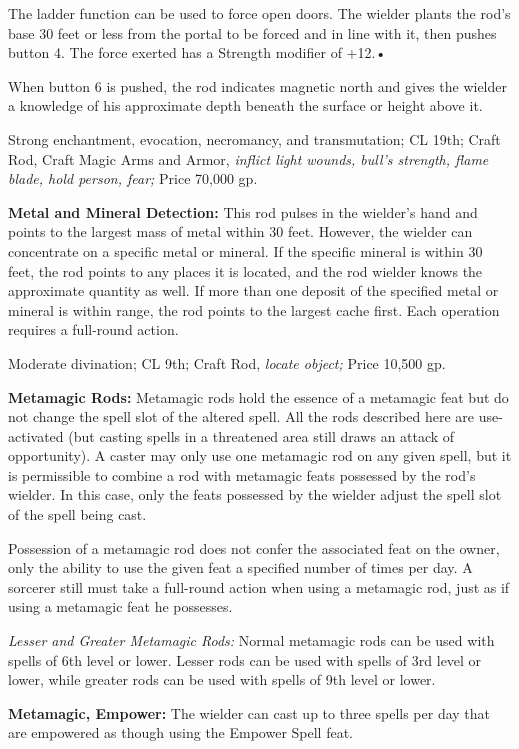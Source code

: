 The ladder function can be used to force open doors. The wielder plants the rod's 
base 30 feet or less from the portal to be forced and in line with it, then pushes 
button 4. The force exerted has a Strength modifier of +12.•

When button 6 is pushed, the rod indicates magnetic north and gives the wielder 
a knowledge of his approximate depth beneath the surface or height above it.

Strong enchantment, evocation, necromancy, and transmutation; CL 19th; Craft Rod, 
Craft Magic Arms and Armor, \textit{inflict light wounds, bull's strength, flame 
blade, hold person, fear; }Price 70,000 gp.

\textbf{Metal and Mineral Detection:} This rod pulses in the wielder's hand and 
points to the largest mass of metal within 30 feet. However, the wielder can concentrate 
on a specific metal or mineral. If the specific mineral is within 30 feet, the 
rod points to any places it is located, and the rod wielder knows the approximate 
quantity as well. If more than one deposit of the specified metal or mineral is 
within range, the rod points to the largest cache first. Each operation requires 
a full-round action.

Moderate divination; CL 9th; Craft Rod, \textit{locate object; }Price 10,500 gp.

\textbf{Metamagic Rods:} Metamagic rods hold the essence of a metamagic feat but 
do not change the spell slot of the altered spell. All the rods described here 
are use-activated (but casting spells in a threatened area still draws an attack 
of opportunity). A caster may only use one metamagic rod on any given spell, but 
it is permissible to combine a rod with metamagic feats possessed by the rod's 
wielder. In this case, only the feats possessed by the wielder adjust the spell 
slot of the spell being cast.

Possession of a metamagic rod does not confer the associated feat on the owner, 
only the ability to use the given feat a specified number of times per day. A sorcerer 
still must take a full-round action when using a metamagic rod, just as if using 
a metamagic feat he possesses.

\textit{Lesser and Greater Metamagic Rods: }Normal metamagic rods can be used with 
spells of 6th level or lower. Lesser rods can be used with spells of 3rd level 
or lower, while greater rods can be used with spells of 9th level or lower.

\textbf{Metamagic, Empower: }The wielder can cast up to three spells per day that 
are empowered as though using the Empower Spell feat.


